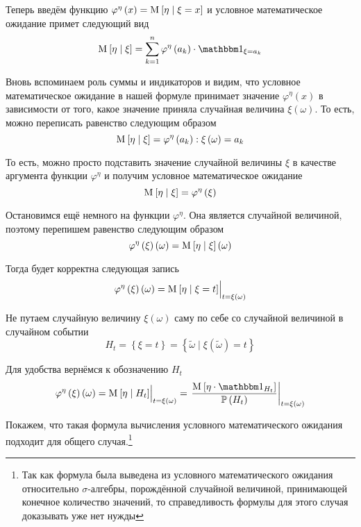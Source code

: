Теперь введём функцию
$\varphi^{\eta}\left( x \right) = \mathrm{M}_{} \left[  \eta \mid \xi=x  \right]$
и условное математическое ожидание примет следующий вид
$$\Mean{ \eta \mid \xi }
    = \sum_{k=1}^n \varphi^{\eta}\left( a_k \right)
        \cdot \indicatorof{\xi = a_k}$$

Вновь вспоминаем роль суммы и индикаторов и видим,
что условное математическое ожидание в нашей формуле
принимает значение $\varphi^{\eta}\left( x \right)$ в зависимости от того,
какое значение приняла случайная величина $\xi\left( \omega \right)$.
То есть, можно переписать равенство следующим образом
$$\mathrm{M}_{} \left[  \eta \mid \xi  \right]
    = \varphi^{\eta}\left( a_k \right): \xi\left( \omega \right) = a_k$$

То есть, можно просто подставить значение случайной величины $\xi$
в качестве аргумента функции $\varphi^{\eta}$
и получим условное математическое ожидание
$$\mathrm{M}_{} \left[  \eta \mid \xi  \right]
    = \varphi^{\eta}\left( \xi \right)$$

Остановимся ещё немного на функции $\varphi^{\eta}$.
Она является случайной величиной, поэтому перепишем равенство следующим образом
$$\varphi^{\eta}\left( \xi \right)\left( \omega \right)
    = \mathrm{M}_{} \left[  \eta \mid \xi  \right]\left( \omega \right)$$

Тогда будет корректна следующая запись
$$\varphi^{\eta}\left( \xi \right)\left( \omega \right)
    = \Bigl. \mathrm{M}_{} \left[  \eta \mid \xi = t  \right]
        \Bigr|_{t=\xi\left( \omega \right)}$$

Не путаем случайную величину $\xi\left( \omega \right)$ саму по себе
со случайной величиной в случайном событии
$$H_t = \left\{ \xi = t \right\}
    = \left\{ \tilde{\omega}\mid \xi\left( \tilde{\omega} \right) = t \right\}$$

Для удобства вернёмся к обозначению $H_t$
$$\varphi^{\eta}\left( \xi \right)\left( \omega \right)
    = \Bigl. \Mean{ \eta \mid H_t }
        \Bigr|_{t=\xi\left( \omega \right)}
    = \left. \frac{\Mean{ \eta \cdot \indicatorof{H_t} }}
        {\probability{H_t}} \right|_{t=\xi\left( \omega \right)}$$

Покажем, что такая формула вычисления условного математического ожидания
подходит для общего случая.\footnote{Так как формула была выведена из
условного математического ожидания относительно $\sigma$-алгебры,
порождённой случайной величиной, принимающей конечное количество значений,
то справедливость формулы для этого случая доказывать уже нет нужды}

